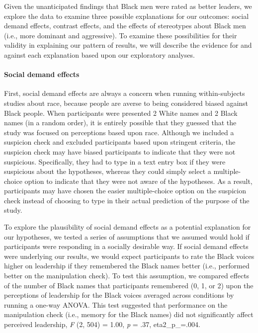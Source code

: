 \documentclass[
  english,
  man]{apa6}
\let\oldparagraph\paragraph
\renewcommand{\paragraph}[1]{\oldparagraph{#1}\mbox{}}
\begin{document}
Given the unanticipated findings that Black men were rated as better leaders, we explore the data to examine three possible explanations for our outcomes: social demand effects, contrast effects, and the effects of stereotypes about Black men (i.e., more dominant and aggressive). To examine these possibilities for their validity in explaining our pattern of results, we will describe the evidence for and against each explanation based upon our exploratory analyses.

\hypertarget{social-demand-effects}{%
\paragraph{Social demand effects}\label{social-demand-effects}}

First, social demand effects are always a concern when running within-subjects studies about race, because people are averse to being considered biased against Black people. When participants were presented 2 White names and 2 Black names (in a random order), it is entirely possible that they guessed that the study was focused on perceptions based upon race. Although we included a suspicion check and excluded participants based upon stringent criteria, the suspicion check may have biased participants to indicate that they were not suspicious. Specifically, they had to type in a text entry box if they were suspicious about the hypotheses, whereas they could simply select a multiple-choice option to indicate that they were not aware of the hypotheses. As a result, participants may have chosen the easier multiple-choice option on the suspicion check instead of choosing to type in their actual prediction of the purpose of the study.

To explore the plausibility of social demand effects as a potential explanation for our hypotheses, we tested a series of assumptions that we assumed would hold if participants were responding in a socially desirable way. If social demand effects were underlying our results, we would expect participants to rate the Black voices higher on leadership if they remembered the Black names better (i.e., performed better on the manipulation check). To test this assumption, we compared effects of the number of Black names that participants remembered (0, 1, or 2) upon the perceptions of leadership for the Black voices averaged across conditions by running a one-way ANOVA. This test suggested that performance on the manipulation check (i.e., memory for the Black names) did not significantly affect perceived leadership, \emph{F} (2, 504) = 1.00, \emph{p} = .37, eta2\_p\_=.004.
\end{document}
